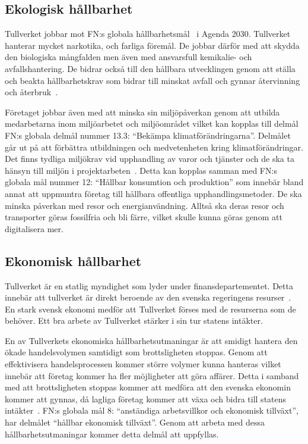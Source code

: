 \subsection{Ekologisk hållbarhet}

Tullverket jobbar mot FN:s globala hållbarhetsmål~\cite{fnmal} i Agenda 2030.
Tullverket hanterar mycket narkotika, och farliga föremål. De jobbar därför med
att skydda den biologiska mångfalden men även med ansvarsfull kemikalie- och
avfallshantering. De bidrar också till den hållbara utvecklingen genom att
ställa och beakta hållbarhetskrav som bidrar till minskat avfall och gynnar
återvinning och återbruk~\cite{policy2021}.

Företaget jobbar även med att minska sin miljöpåverkan genom att utbilda
medarbetarna inom miljöarbetet och miljöområdet vilket kan kopplas till delmål
FN:s globala delmål nummer 13.3: ``Bekämpa klimatförändringarna''. Delmålet
går ut på att förbättra utbildningen och medvetenheten kring
klimatförändringar. Det finns tydliga miljökrav vid upphandling av varor och
tjänster och de ska ta hänsyn till miljön i projektarbeten~\cite{miljo}. Detta
kan kopplas samman med FN:s globala mål nummer 12: ``Hållbar konsumtion och
produktion'' som innebär bland annat att uppmuntra företag till hållbara
offentliga upphandlingsmetoder.  De ska minska påverkan med resor och
energianvändning. Alltså ska deras resor och transporter göras fossilfria och
bli färre, vilket skulle kunna göras genom att digitalisera mer. 

\subsection{Ekonomisk hållbarhet}

Tullverket är en statlig myndighet som lyder under finansdepartementet. Detta
innebär att tullverket är direkt beroende av den svenska regeringens
resurser~\cite{styrning}. En stark svensk ekonomi medför att Tullverket förses
med de resurserna som de behöver. Ett bra arbete av Tullverket stärker i sin
tur statens intäkter.

En av Tullverkets ekonomiska hållbarhetsutmaningar är att smidigt hantera den
ökade handelsvolymen samtidigt som brottsligheten stoppas. Genom att
effektivisera handelsprocessen kommer större volymer kunna hanteras vilket
innebär att företag kommer ha fler möjligheter att göra affärer. Detta i
samband med att brottsligheten stoppas kommer att medföra att den svenska
ekonomin kommer att gynnas, då lagliga företag kommer att växa och bidra till
statens intäkter~\cite{handeln}. FN:s globala mål 8: ``anständiga arbetsvillkor
och ekonomisk tillväxt'', har delmålet ``hållbar ekonomisk tillväxt''. Genom
att arbeta med dessa hållbarhetsutmaningar kommer detta delmål att uppfyllas. 
